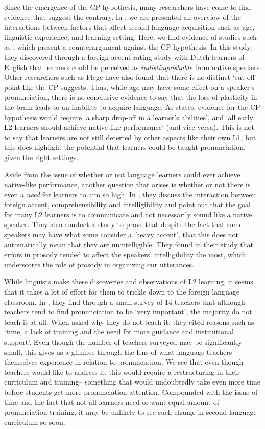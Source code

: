 \documentclass
[
    a4paper,
    twoside,
    12pt
]
{report}
\begin{document}
Since the emergence of the CP hypothesis, many researchers have come to
find evidence that suggest the contrary. In \textcite{lengeris2012}, we
are presented an overview of the interactions between factors that
affect second language acquisition such as age, linguistic experience,
and learning setting. Here, we find evidence of studies such as
\textcite{bongaerts1995}, which present a counterargument against the CP
hypothesis. In this study, they discovered through a foreign accent
rating study with Dutch learners of English that learners could be
perceived as \textit{indistinguishable} from native speakers. Other
researchers such as Flege have also found that there is no distinct
`cut-off' point like the CP suggests. Thus, while age may have some
effect on a speaker's pronunciation, there is no conclusive evidence to
say that the loss of plasticity in the brain leads to an inability to
acquire language. As \textcite{lengeris2012} states, evidence for the CP
hypothesis would require `a sharp drop-off in a learner's abilities',
and `all early L2 learners should achieve native-like performance' (and
vice versa). This is not to say that learners are not still deterred by
other aspects like their own L1, but this does highlight the potential
that learners could be taught pronunciation, given the right settings.

Aside from the issue of whether or not language learners could ever
achieve native-like performance, another question that arises is whether
or not there is even a \textit{need} for learners to aim so high. In
\textcite{munro1999}, they discuss the interaction between foreign
accent, comprehensibility and intelligibility and point out that the
goal for many L2 learners is to communicate and not necessarily sound
like a native speaker. They also conduct a study to prove that despite
the fact that some speakers may have what some consider a `heavy
accent', that this does not automatically mean that they are
unintelligible. They found in their study that errors in prosody tended
to affect the speakers' intelligibility the most, which underscores the
role of prosody in organizing our utterances.

While linguists make these discoveries and observations of L2 learning,
it seems that it takes a lot of effort for them to trickle down to the
foreign language classroom. In \textcite{darcy2012}, they find through a
small survey of 14 teachers that although teachers tend to find
pronunciation to be `very important', the majority do not teach it at
all. When asked why they do not teach it, they cited reasons such as
`time, a lack of training and the need for more guidance and
institutional support'. Even though the number of teachers surveyed may
be significantly small, this gives us a glimpse through the lens of what
language teachers themselves experience in relation to pronunciation. We
see that even though teachers would like to address it, this would
require a restructuring in their curriculum and training-- something
that would undoubtedly take even more time before students get more
pronunciation attention. Compounded with the issue of time and the fact
that not all learners need or want equal amount of pronunciation
training, it may be unlikely to see such change in second language
curriculum so soon.
\end{document}
